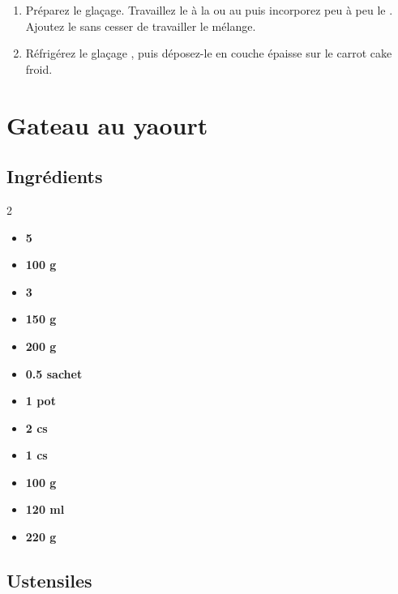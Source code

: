 \begin{enumerate}
\item Préparez le glaçage. Travaillez le  à la  ou au  puis incorporez peu à peu le . Ajoutez le  sans cesser de travailler le mélange.
\item Réfrigérez le glaçage , puis déposez-le en couche épaisse sur le carrot cake froid.
\end{enumerate}

\chapter*{Gateau au yaourt}

\section*{Ingrédients}

\begin{multicols}{2}
\begin{itemize}[leftmargin=*]
\item \textbf{5} 
\item \textbf{100 g} 
\item \textbf{3} 
\item \textbf{150 g} 
\item \textbf{200 g} 
\item \textbf{0.5 sachet} 
\item \textbf{1 pot} 
\item \textbf{2 cs} 
\item \textbf{1 cs} 
\item \textbf{100 g} 
\item \textbf{120 ml} 
\item \textbf{220 g} 
\end{itemize}
\end{multicols}

\section*{Ustensiles}

